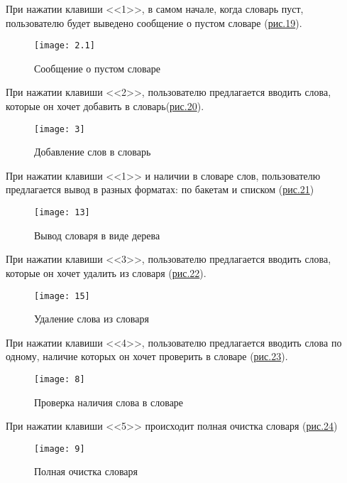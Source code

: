 \documentclass[10pt,a4paper,final]{article} %
\begin{document}
При нажатии клавиши <<1>>, в самом начале, когда словарь пуст, пользователю будет выведено сообщение о пустом словаре (\hyperref[fig:14]{рис.19}).

\begin{figure}[htbp]
	\centering
	\texttt{[image: 2.1]}
	\caption{Сообщение о пустом словаре}
	\label{fig:14}
\end{figure}

\newpage
При нажатии клавиши <<2>>, пользователю предлагается вводить слова, которые он хочет добавить в словарь(\hyperref[fig:15]{рис.20}).

\begin{figure}[htbp]
	\centering
	\texttt{[image: 3]}
	\caption{Добавление слов в словарь}
	\label{fig:15}
\end{figure}

При нажатии клавиши <<1>> и наличии в словаре слов, пользователю предлагается вывод в разных форматах: по бакетам и списком (\hyperref[fig:16]{рис.21})

\begin{figure}[htbp]
	\centering
	\texttt{[image: 13]}
	\caption{Вывод словаря в виде дерева}
	\label{fig:16}
\end{figure}

При нажатии клавиши <<3>>, пользователю предлагается вводить слова, которые он хочет удалить из словаря (\hyperref[fig:17]{рис.22}).

\begin{figure}[htbp]
	\centering
	\texttt{[image: 15]}
	\caption{Удаление слова из словаря}
	\label{fig:17}
\end{figure}

\newpage
При нажатии клавиши <<4>>, пользователю предлагается вводить слова по одному, наличие которых он хочет проверить в словаре (\hyperref[fig:18]{рис.23}).

\begin{figure}[htbp]
	\centering
	\texttt{[image: 8]}
	\caption{Проверка наличия слова в словаре}
	\label{fig:18}
\end{figure}


При нажатии клавиши <<5>> происходит полная очистка словаря (\hyperref[fig:19]{рис.24})

\begin{figure}[htbp]
	\centering
	\texttt{[image: 9]}
	\caption{Полная очистка словаря}
	\label{fig:19}
\end{figure}
\end{document}
